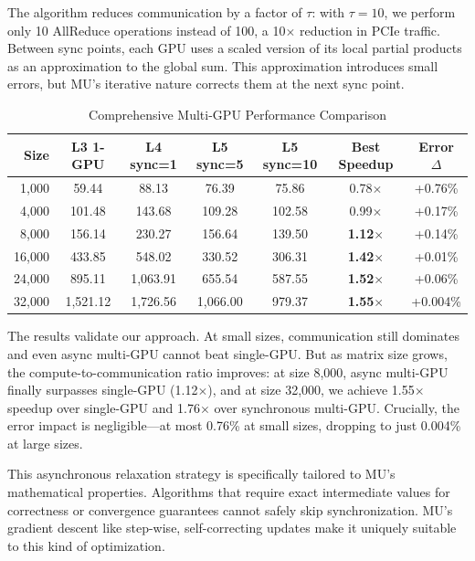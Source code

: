 \documentclass[11pt]{article}
\begin{document}
The algorithm reduces communication by a factor of $\tau$: with $\tau = 10$, we perform only 10 AllReduce operations instead of 100, a 10$\times$ reduction in PCIe traffic. Between sync points, each GPU uses a scaled version of its local partial products as an approximation to the global sum. This approximation introduces small errors, but MU's iterative nature corrects them at the next sync point.

\begin{table}[h]
\centering
\caption{Comprehensive Multi-GPU Performance Comparison}
\label{tab:multigpu_full}
\begin{tabular}{@{}rcccccc@{}}
\toprule
Size & L3 1-GPU & L4 sync=1 & L5 sync=5 & L5 sync=10 & Best Speedup & Error $\Delta$ \\ \midrule
1,000 & 59.44 & 88.13 & 76.39 & 75.86 & 0.78$\times$ & +0.76\% \\
4,000 & 101.48 & 143.68 & 109.28 & 102.58 & 0.99$\times$ & +0.17\% \\
8,000 & 156.14 & 230.27 & 156.64 & 139.50 & \textbf{1.12$\times$} & +0.14\% \\
16,000 & 433.85 & 548.02 & 330.52 & 306.31 & \textbf{1.42$\times$} & +0.01\% \\
24,000 & 895.11 & 1,063.91 & 655.54 & 587.55 & \textbf{1.52$\times$} & +0.06\% \\
32,000 & 1,521.12 & 1,726.56 & 1,066.00 & 979.37 & \textbf{1.55$\times$} & +0.004\% \\ \bottomrule
\end{tabular}
\end{table}

The results validate our approach. At small sizes, communication still dominates and even async multi-GPU cannot beat single-GPU. But as matrix size grows, the compute-to-communication ratio improves: at size 8,000, async multi-GPU finally surpasses single-GPU (1.12$\times$), and at size 32,000, we achieve 1.55$\times$ speedup over single-GPU and 1.76$\times$ over synchronous multi-GPU. Crucially, the error impact is negligible---at most 0.76\% at small sizes, dropping to just 0.004\% at large sizes.

This asynchronous relaxation strategy is specifically tailored to MU's mathematical properties. Algorithms that require exact intermediate values for correctness or convergence guarantees cannot safely skip synchronization. MU's gradient descent like step-wise, self-correcting updates make it uniquely suitable to this kind of optimization.
\end{document}
